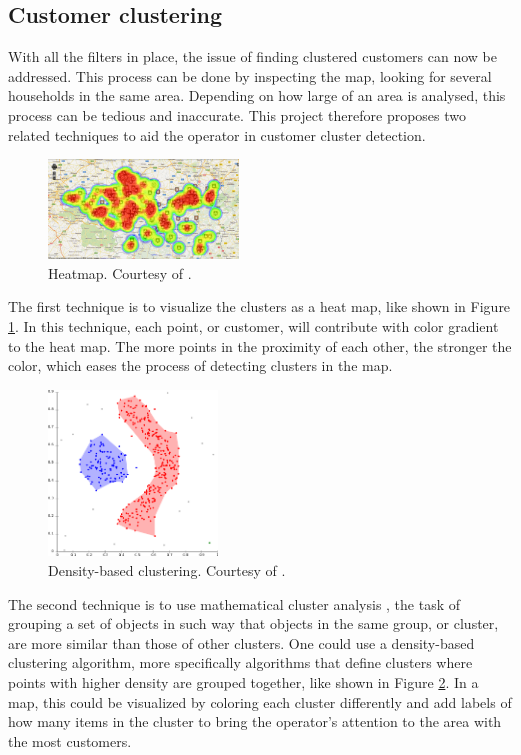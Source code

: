 \documentclass[twocolumn]{article}
\begin{document}
\subsection{Customer clustering}
\label{sub:Customer clustering}
With all the filters in place, the issue of finding clustered customers can now be addressed. This process can be done by inspecting the map, looking for several households in the same area. Depending on how large of an area is analysed, this process can be tedious and inaccurate. This project therefore proposes two related techniques to aid the operator in customer cluster detection.

\begin{figure}
  \centering
  \includegraphics[width=0.45\textwidth]{img/heatmap.png}
  \caption{Heatmap. Courtesy of \cite{heatmap}.}
  \label{fig:heatmap}
\end{figure}
The first technique is to visualize the clusters as a heat map, like shown in Figure \ref{fig:heatmap}. In this technique, each point, or customer, will contribute with color gradient to the heat map. The more points in the proximity of each other, the stronger the color, which eases the process of detecting clusters in the map.

\begin{figure}
  \centering
  \includegraphics[width=0.40\textwidth]{img/dbscan.png}
  \caption{Density-based clustering. Courtesy of \cite{Wikipedia_contributors2014-qv}.}
  \label{fig:dbscan}
\end{figure}
The second technique is to use mathematical cluster analysis \cite{Wikipedia_contributors2014-qv}, the task of grouping a set of objects in such way that objects in the same group, or cluster, are more similar than those of other clusters. One could use a density-based clustering algorithm, more specifically algorithms that define clusters where points with higher density are grouped together, like shown in Figure \ref{fig:dbscan}. In a map, this could be visualized by coloring each cluster differently and add labels of how many items in the cluster to bring the operator's attention to the area with the most customers.
\end{document}
